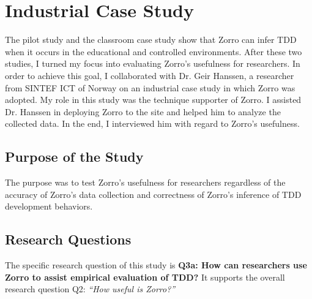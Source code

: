 \chapter{Industrial Case Study}
\label{ch:Industry}

The pilot study and the classroom case study show that Zorro can infer TDD when it occurs in the educational and controlled environments. After these two studies, I turned my focus into evaluating Zorro's usefulness for researchers. In order to achieve this goal, I collaborated with Dr. Geir Hanssen, a researcher from SINTEF ICT of Norway on an industrial case study in which Zorro was adopted. My role in this study was the technique supporter of Zorro. I assisted Dr. Hanssen in deploying Zorro to the site and helped him to analyze the collected data. In the end, I interviewed him with regard to Zorro's usefulness.

\section{Purpose of the Study}

The purpose was to test Zorro's usefulness for researchers regardless of the accuracy of Zorro's data collection and correctness of Zorro's inference of TDD development behaviors.

\section{Research Questions}
\label{sec:Industry-Questions}
The specific research question of this study is \textbf{Q3a: How can researchers use Zorro to assist empirical evaluation of TDD?} It supports the overall research question Q2: \textit{``How useful is Zorro?''} 

